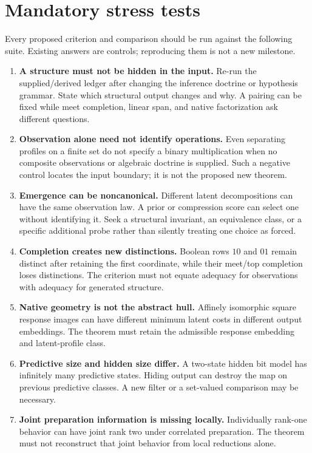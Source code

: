 \documentclass[11pt]{article}
\theoremstyle{remark}
\begin{document}
\section{Mandatory stress tests}
\label{sec:stress}

Every proposed criterion and comparison should be run against the following suite. Existing answers are controls; reproducing them is not a new milestone.

\begin{enumerate}
\item \textbf{A structure must not be hidden in the input.} Re-run the supplied/derived ledger after changing the inference doctrine or hypothesis grammar. State which structural output changes and why. A pairing can be fixed while meet completion, linear span, and native factorization ask different questions.
\item \textbf{Observation alone need not identify operations.} Even separating profiles on a finite set do not specify a binary multiplication when no composite observations or algebraic doctrine is supplied. Such a negative control locates the input boundary; it is not the proposed new theorem.
\item \textbf{Emergence can be noncanonical.} Different latent decompositions can have the same observation law. A prior or compression score can select one without identifying it. Seek a structural invariant, an equivalence class, or a specific additional probe rather than silently treating one choice as forced.
\item \textbf{Completion creates new distinctions.} Boolean rows $10$ and $01$ remain distinct after retaining the first coordinate, while their meet/top completion loses distinctions. The criterion must not equate adequacy for observations with adequacy for generated structure.
\item \textbf{Native geometry is not the abstract hull.} Affinely isomorphic square response images can have different minimum latent costs in different output embeddings. The theorem must retain the admissible response embedding and latent-profile class.
\item \textbf{Predictive size and hidden size differ.} A two-state hidden bit model has infinitely many predictive states. Hiding output can destroy the map on previous predictive classes. A new filter or a set-valued comparison may be necessary.
\item \textbf{Joint preparation information is missing locally.} Individually rank-one behavior can have joint rank two under correlated preparation. The theorem must not reconstruct that joint behavior from local reductions alone.

\end{enumerate}
\end{document}
